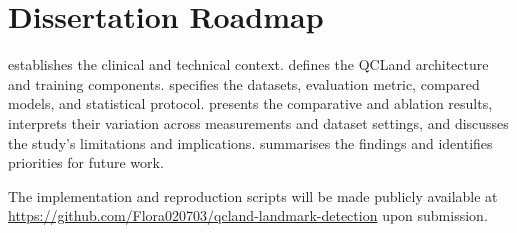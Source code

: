 
\section{Dissertation Roadmap}
\label{sec:intro-structure}

 establishes the clinical and technical
context.  defines the QCLand architecture and
training components.  specifies the
datasets, evaluation metric, compared models, and statistical
protocol.  presents the comparative and ablation
results, interprets their variation across measurements and dataset
settings, and discusses the study's limitations and implications.
 summarises the findings and identifies
priorities for future work.

The implementation and reproduction scripts will be made publicly
available at
\url{https://github.com/Flora020703/qcland-landmark-detection}
upon submission.
